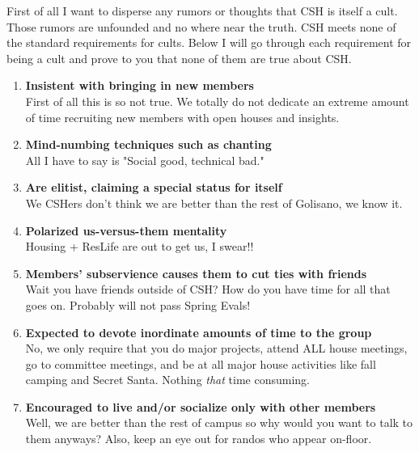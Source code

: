 \documentclass[9pt]{extarticle} %
\begin{document}
\begin{minipage}[t]{.61\linewidth} %
\vspace{-0.4cm}
\hypertarget{firstnews}{}

First of all I want to disperse any rumors or thoughts that CSH is itself a
cult. Those rumors are unfounded and no where near the truth. CSH meets none of
the standard requirements for cults. Below I will go through each requirement 
for being a cult and prove to you that none of them are true about CSH. 
\begin{enumerate}
\item \textbf{Insistent with bringing in new members} \\ 
First of all this is so not true. We totally do not dedicate an extreme 
amount of time recruiting new members with open houses and insights.

\item \textbf{Mind-numbing techniques such as chanting} \\
All I have to say is "Social good, technical bad."

\item \textbf{Are elitist, claiming a special status for itself} \\
We CSHers don't think we are better than the rest of Golisano, we
know it.

\item \textbf{Polarized us-versus-them mentality} \\
Housing + ResLife are out to get us, I swear!!

\item \textbf{Members' subservience causes them to cut ties with friends} \\
Wait you have friends outside of CSH? How do you have time for all that goes on.
Probably will not pass Spring Evals!

\item \textbf{Expected to devote inordinate amounts of time to the group} \\
No, we only require that you do major projects, attend ALL house meetings,
go to committee meetings, and be at all major house activities like fall camping
and Secret Santa. Nothing \textit{that} time consuming.

\item \textbf{Encouraged to live and/or socialize only with other members} \\
Well, we are better than the rest of campus so why would you want to talk to
them anyways? Also, keep an eye out for randos who appear on-floor. 


\end{enumerate}
\end{minipage}
\end{document}
